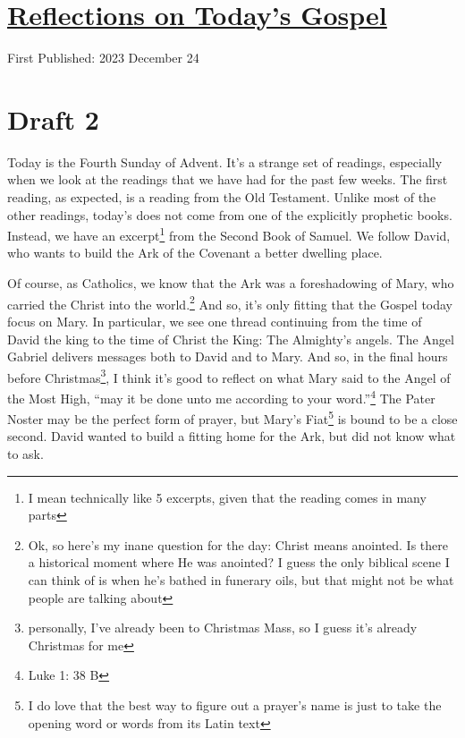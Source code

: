 \documentclass[12pt]{article}[titlepage]
\newcommand{\say}[1]{``#1''}
\newcommand{\1}{\={a}}
\newcommand{\2}{\={e}}
\newcommand{\3}{\={\i}}
\newcommand{\4}{\=o}
\newcommand{\5}{\=u}
\newcommand{\6}{\={A}}
\renewcommand{\,}{\textsuperscript{,}}
\begin{document}
\doublespacing
\section{\href{reflections-on-readings-4-advent-b-23.html}{Reflections on Today's Gospel}}
First Published: 2023 December 24

\section{Draft 2}
Today is the Fourth Sunday of Advent.
It's a strange set of readings, especially when we look at the readings that we have had for the past few weeks.
The first reading, as expected, is a reading from the Old Testament.
Unlike most of the other readings, today's does not come from one of the explicitly prophetic books.
Instead, we have an excerpt\footnote{I mean technically like 5 excerpts, given that the reading comes in many parts} from the Second Book of Samuel.
We follow David, who wants to build the Ark of the Covenant a better dwelling place.

Of course, as Catholics, we know that the Ark was a foreshadowing of Mary, who carried the Christ into the world.\footnote{Ok, so here's my inane question for the day: Christ means anointed. Is there a historical moment where He was anointed? I guess the only biblical scene I can think of is when he's bathed in funerary oils, but that might not be what people are talking about}
And so, it's only fitting that the Gospel today focus on Mary.
In particular, we see one thread continuing from the time of David the king to the time of Christ the King: The Almighty's angels.
The Angel Gabriel delivers messages both to David and to Mary.
And so, in the final hours before Christmas\footnote{personally, I've already been to Christmas Mass, so I guess it's already Christmas for me}, I think it's good to reflect on what Mary said to the Angel of the Most High, \say{may it be done unto me according to your word.}\footnote{Luke 1: 38 B}
The Pater Noster may be the perfect form of prayer, but Mary's Fiat\footnote{I do love that the best way to figure out a prayer's name is just to take the opening word or words from its Latin text} is bound to be a close second.
David wanted to build a fitting home for the Ark, but did not know what to ask.
\end{document}
